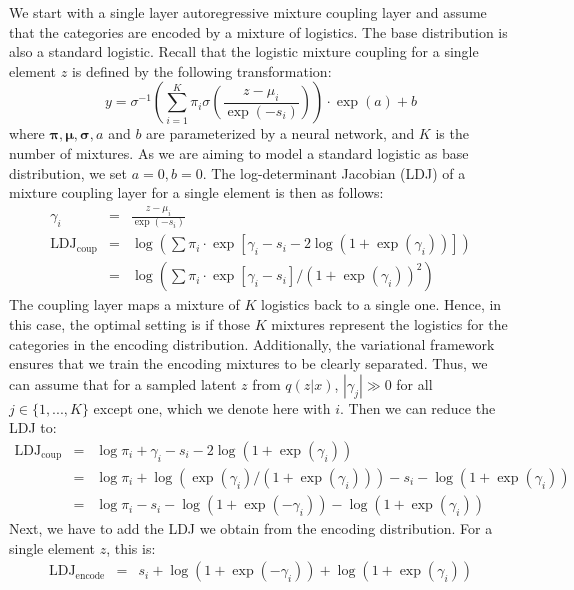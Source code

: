 We start with a single layer autoregressive mixture coupling layer and assume that the categories are encoded by a mixture of logistics. 
The base distribution is also a standard logistic.
Recall that the logistic mixture coupling for a single element $z$ is defined by the following transformation:
\begin{equation}
    y = \sigma^{-1}\left(\sum_{i=1}^{K} \pi_i \sigma\left(\frac{z-\mu_i}{\exp(-s_i)}\right)\right)\cdot \exp(a)+b
\end{equation}
where $\bm{\pi}, \bm{\mu}, \bm{\sigma}, a$ and $b$ are parameterized by a neural network, and $K$ is the number of mixtures.
As we are aiming to model a standard logistic as base distribution, we set $a=0,b=0$.
The log-determinant Jacobian (LDJ) of a mixture coupling layer for a single element is then as follows:
\begin{eqnarray}
\gamma_i & = & \frac{z-\mu_i}{\exp(-s_i)}\\
\text{LDJ}_{\text{coup}} & = & \log \left(\sum \pi_i \cdot \exp\left[\gamma_i - s_i - 2\log\left(1+\exp(\gamma_i)\right)\right]\right)\\
& = & \log \left(\sum \pi_i \cdot \exp\left[\gamma_i - s_i\right]/\left(1+\exp(\gamma_i)\right)^2\right)
\end{eqnarray}
The coupling layer maps a mixture of $K$ logistics back to a single one.
Hence, in this case, the optimal setting is if those $K$ mixtures represent the logistics for the categories in the encoding distribution.
Additionally, the variational framework ensures that we train the encoding mixtures to be clearly separated. 
Thus, we can assume that for a sampled latent $z$ from $q(z|x)$, $|\gamma_j|\gg0$ for all $j\in\{1,...,K\}$ except one, which we denote here with $i$. Then we can reduce the LDJ to:
\begin{eqnarray}
\text{LDJ}_{\text{coup}} & = & \log \pi_i + \gamma_i - s_i - 2\log\left(1+\exp(\gamma_i)\right)\\
& = & \log \pi_i + \log\left(\exp(\gamma_i)/\left(1+\exp(\gamma_i)\right)\right) - s_i - \log\left(1+\exp(\gamma_i)\right)\\
& = & \log \pi_i - s_i - \log\left(1+\exp(-\gamma_i)\right) - \log\left(1+\exp(\gamma_i)\right)
\end{eqnarray}	
Next, we have to add the LDJ we obtain from the encoding distribution. 
For a single element $z$, this is:
\begin{eqnarray}
\text{LDJ}_{\text{encode}} & = & s_i + \log\left(1+\exp(-\gamma_i)\right) + \log\left(1+\exp(\gamma_i)\right)
\end{eqnarray}
